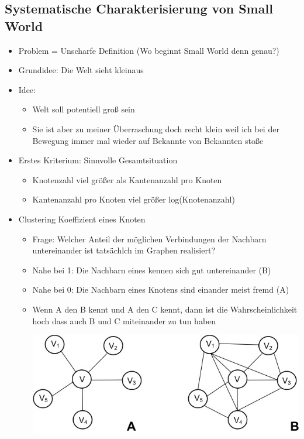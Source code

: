 \documentclass{article} %
\begin{document}
	\subsection{Systematische Charakterisierung von Small World}
	\begin{itemize}
		\item Problem = Unscharfe Definition (Wo beginnt Small World denn genau?)
		\item Grundidee: Die Welt sieht \glqq klein\grqq aus
		\item Idee:
		\begin{itemize}
			\item Welt soll potentiell groß sein 
			\item Sie ist aber zu meiner Überraschung doch recht klein weil ich bei der Bewegung immer mal wieder auf Bekannte von Bekannten stoße
		\end{itemize}
		\item Erstes Kriterium: Sinnvolle Gesamtsituation
		\begin{itemize}
			\item Knotenzahl viel größer als Kantenanzahl pro Knoten
			\item Kantenanzahl pro Knoten viel größer log(Knotenanzahl)
		\end{itemize}
		\item Clustering Koeffizient eines Knoten
		\begin{itemize}
			\item Frage: Welcher Anteil der möglichen Verbindungen der Nachbarn untereinander ist tatsächlch im Graphen realisiert?
			\item Nahe bei 1: Die Nachbarn eines kennen sich gut untereinander (B)
			\item Nahe bei 0: Die Nachbarn eines Knotens sind einander meist fremd (A)
			\item \glqq Wenn A den B kennt und A den C kennt, dann ist die Wahrscheinlichkeit hoch dass auch B und C miteinander zu tun haben
			\begin{center}
				\includegraphics[scale=3]{img/cluster_koeffizient.jpg}

\end{center}
\end{itemize}
\end{itemize}
\end{document}
